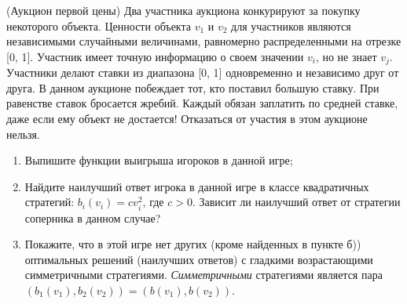 \begin{comment}
Используя это и кососимметричность матрицы $A$, покажите
\[
M\left[ {\Phi \left( {t+1} \right)} \right]\le M\left[ {\Phi \left( t 
\right)} \right]\left( {1+{\varepsilon ^2} \mathord{\left/ {\vphantom 
{{\varepsilon ^2} 6}} \right. \kern-\nulldelimiterspace} 6} \right).
\]
Следовательно, $M\left[ {\Phi \left( t \right)} \right]\le n\exp \left( 
{{t\varepsilon ^2} \mathord{\left/ {\vphantom {{t\varepsilon ^2} 6}} \right. 
\kern-\nulldelimiterspace} 6} \right)$ и $M\left[ {\Phi \left( {t^\ast } 
\right)} \right]\le n^{5 \mathord{\left/ {\vphantom {5 3}} \right. 
\kern-\nulldelimiterspace} 3}$. Отсюда по неравенству Маркова имеем, что 
($n\ge 8)$
\[
P\left( {\Phi \left( {t^\ast } \right)\le n^2} \right)\ge P\left( {\Phi 
\left( {t^\ast } \right)\le 2n^{5 \mathord{\left/ {\vphantom {5 3}} \right. 
\kern-\nulldelimiterspace} 3}} \right)\ge 1 \mathord{\left/ {\vphantom {1 
2}} \right. \kern-\nulldelimiterspace} 2.
\]
Тогда $P\left( {{\varepsilon U_i \left( {t^\ast } \right)} \mathord{\left/ 
{\vphantom {{\varepsilon U_i \left( {t^\ast } \right)} 2}} \right. 
\kern-\nulldelimiterspace} 2\le 2\ln n,\;i=1,...,n} \right)\ge 1 
\mathord{\left/ {\vphantom {1 2}} \right. \kern-\nulldelimiterspace} 2$. 
Откуда уже следует, что $P\left( {\vec {x}\left( {t^\ast } \right)\le 
\varepsilon \vec {e}} \right)\ge 1 \mathord{\left/ {\vphantom {1 2}} \right. 
\kern-\nulldelimiterspace} 2$.
\end{problem}
 \end{comment}

\begin{problem}(Аукцион первой цены)
Два участника аукциона конкурируют за покупку некоторого объекта. Ценности объекта    $v_1$ и $v_2$ для участников являются независимыми случайными величинами, равномерно распределенными на отрезке [0, 1]. Участник  имеет точную информацию о своем значении $v_i$, но не знает $v_j$. Участники делают ставки из диапазона [0, 1] одновременно и независимо друг от друга. В данном аукционе побеждает тот, кто поставил большую ставку. При равенстве ставок бросается жребий. Каждый обязан заплатить по средней ставке, даже если ему объект не достается! Отказаться от участия в этом аукционе нельзя.
\begin{enumerate}
\item Выпишите функции выигрыша игороков в данной игре;
\item Найдите наилучший ответ игрока в данной игре в классе квадратичных стратегий: $b_i(v_i) = cv_i^2$, где $c > 0$. Зависит ли наилучший ответ от стратегии соперника в данном случае?
\item Покажите, что в этой игре нет других (кроме найденных в пункте б)) оптимальных решений (наилучших ответов) с гладкими  возрастающими симметричными стратегиями. \textit{Симметричными} стратегиями является пара $(b_1(v_1), b_2(v_2)) = (b(v_1), b(v_2))$.
\end{enumerate}
\end{problem}

